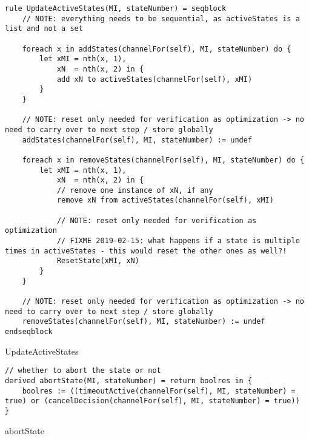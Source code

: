 \begin{listing}[H]
\begin{verbatim}
rule UpdateActiveStates(MI, stateNumber) = seqblock
    // NOTE: everything needs to be sequential, as activeStates is a list and not a set

    foreach x in addStates(channelFor(self), MI, stateNumber) do {
        let xMI = nth(x, 1),
            xN  = nth(x, 2) in {
            add xN to activeStates(channelFor(self), xMI)
        }
    }

    // NOTE: reset only needed for verification as optimization -> no need to carry over to next step / store globally
    addStates(channelFor(self), MI, stateNumber) := undef

    foreach x in removeStates(channelFor(self), MI, stateNumber) do {
        let xMI = nth(x, 1),
            xN  = nth(x, 2) in {
            // remove one instance of xN, if any
            remove xN from activeStates(channelFor(self), xMI)

            // NOTE: reset only needed for verification as optimization
            // FIXME 2019-02-15: what happens if a state is multiple times in activeStates - this would reset the other ones as well?!
            ResetState(xMI, xN)
        }
    }

    // NOTE: reset only needed for verification as optimization -> no need to carry over to next step / store globally
    removeStates(channelFor(self), MI, stateNumber) := undef
endseqblock
\end{verbatim}
\caption{UpdateActiveStates}
\label{lst:asm:UpdateActiveStates}
\end{listing}




\begin{listing}[H]
\begin{verbatim}
// whether to abort the state or not
derived abortState(MI, stateNumber) = return boolres in {
    boolres := ((timeoutActive(channelFor(self), MI, stateNumber) = true) or (cancelDecision(channelFor(self), MI, stateNumber) = true))
}
\end{verbatim}
\caption{abortState}
\label{lst:asm:abortState}
\end{listing}




